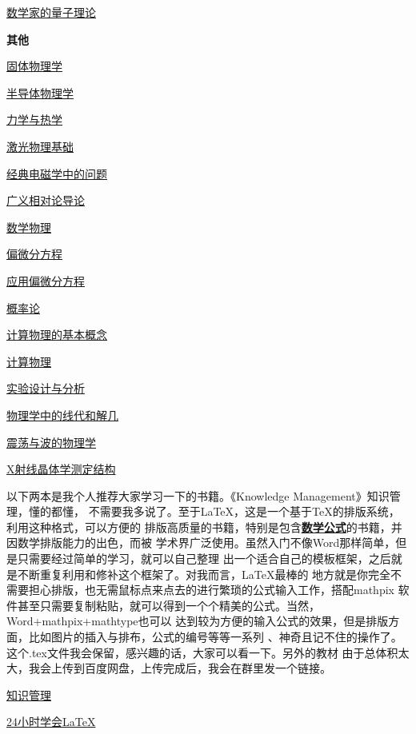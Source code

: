 \documentclass[UTF8]{ctexart}   %
\begin{document}
\href{run:.//Phsics/Quantum Theory for Mathematicians_.pdf\ }{数学家的量子理论}

\centerline{\songti \Large \textbf{其他}}

\href{run:./Physics/Solid-State Physics.pdf\ }{固体物理学}

\href{run:./Physics/The Physics of Semiconductors.pdf\ }{半导体物理学}

\href{run:./Physics/Mechanics And Thermodynamics.pdf\ }{力学与热学}

\href{run:./Physics/Basics of Laser Physics.pdf\ }{激光物理基础}

\href{run:./Physics/Problems in Classical Electromagnetism.pdf\ }{经典电磁学中的问题}

\href{run:./Physics/Introduction to General Relativity.pdf\ }{广义相对论导论}

\href{run:./Physics/Mathematical Physics.pdf\ }{数学物理}

\href{run:./Physics/Partial Differential Equations.pdf\ }{偏微分方程}

\href{run:./Physics/Applied Partial Differential Equations_.pdf\ }{应用偏微分方程}

\href{run:./Physics/Probability Theory.pdf\ }{概率论}

\href{run:./Physics/Basic Concepts in Computational Physics_.pdf\ }{计算物理的基本概念}

\href{run:./Physics/Computational Physics_.pdf\ }{计算物理}

\href{run:./Physics/Design and Analysis of Experiments_.pdf\ }{实验设计与分析}

\href{run:./Physics/Linear Algebra and Analytic Geometry for Physical Sciences.pdf\ }{物理学中的线代和解几}

\href{run:./Physics/Physics of Oscillations and Waves.pdf\ }{震荡与波的物理学}

\href{run:./Physics/Structure Determination by X-ray Crystallography_.pdf\ }{X射线晶体学测定结构}

\clearpage

以下两本是我个人推荐大家学习一下的书籍。《Knowledge Management》知识管理，懂的都懂，
不需要我多说了。至于LaTeX，这是一个基于TeX的排版系统，利用这种格式，可以方便的
排版高质量的书籍，特别是包含\underline{\textbf{数学公式}}的书籍，并因数学排版能力的出色，而被
学术界广泛使用。虽然入门不像Word那样简单，但是只需要经过简单的学习，就可以自己整理
出一个适合自己的模板框架，之后就是不断重复利用和修补这个框架了。对我而言，LaTeX最棒的
地方就是你完全不需要担心排版，也无需鼠标点来点去的进行繁琐的公式输入工作，搭配mathpix
软件甚至只需要复制粘贴，就可以得到一个个精美的公式。当然，Word+mathpix+mathtype也可以
达到较为方便的输入公式的效果，但是排版方面，比如图片的插入与排布，公式的编号等等一系列
、神奇且记不住的操作了。这个.tex文件我会保留，感兴趣的话，大家可以看一下。另外的教材
由于总体积太大，我会上传到百度网盘，上传完成后，我会在群里发一个链接。

\href{run:./Physics/Knowledge Management.pdf\ }{知识管理}

\href{run:./Physics/LaTeX in 24 Hours.pdf\ }{24小时学会LaTeX}
\end{document}

